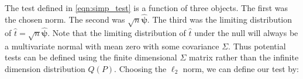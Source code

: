 \documentclass{article}
\newcommand{\tst}{\hat{\boldsymbol{t}}}
\newcommand{\rvt}{Y}
\begin{document}

The test defined in \eqref{eqn:simp_test} is a function of three objects. The first was the chosen norm.  The second was $\sqrt{n}\hat{\boldsymbol{\psi}}$.  The third was the limiting distribution of $\hat{t} = \sqrt{n}\hat{\boldsymbol{\psi}}$.  Note that the limiting distribution of $\hat{t}$ under the null will always be a multivariate normal with mean zero with some covariance $\Sigma$. Thus potential tests can be defined using the finite dimensional $\Sigma$ matrix rather than the infinite dimension distribution $Q(P)$.  Choosing the $\ell_2$ norm, we can define our test by:



\end{document}
